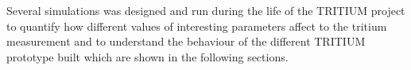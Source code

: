 Several simulations was designed and run during the life of the TRITIUM project to quantify how different values of interesting parameters affect to the tritium measurement and to understand the behaviour of the different TRITIUM prototype built which are shown in the following sections. 
